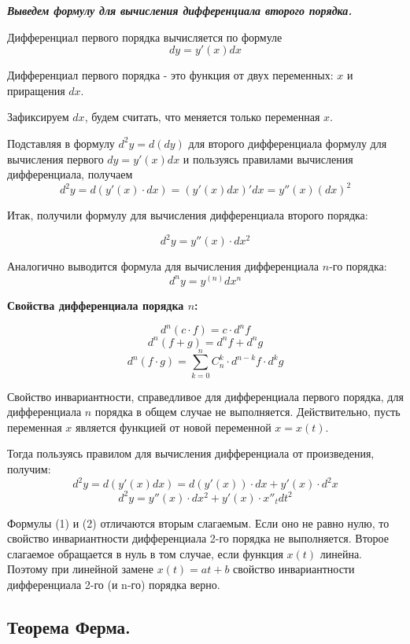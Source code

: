 \documentclass[a4paper,12pt]{article}
\theoremstyle{plain} %
\theoremstyle{definition} %
\theoremstyle{remark} %
\begin{document}
\textbf{\textit{Выведем формулу для вычисления дифференциала второго порядка.}}

Дифференциал первого порядка вычисляется по формуле
\[
	dy = y'(x) dx
\]

Дифференциал первого порядка - это функция от двух переменных: $x$ и приращения $dx$.

Зафиксируем $dx$, будем считать, что меняется только переменная $x$.

Подставляя в формулу $d^2y = d(dy)$ для второго дифференциала формулу для вычисления первого $dy = y'(x)dx$ и пользуясь правилами вычисления дифференциала, получаем
\[
	d^2y = d(y'(x) \cdot dx) = (y'(x)dx)'dx = y''(x)(dx)^2
\]

Итак, получили формулу для вычисления дифференциала второго порядка:

\[
	d^2y = y''(x) \cdot dx^2
\]

Аналогично выводится формула для вычисления дифференциала $n$-го порядка:
\[
	d^ny = y^{(n)}dx^n
\]

\textbf{Свойства дифференциала порядка $n$:}

\[
	d^n(c\cdot f) = c\cdot d^n f
\]
\[
	d^n(f + g) = d^nf + d^ng
\]
\[
	d^n(f\cdot g) = \sum_{k = 0}^n C_n^k \cdot d^{n-k}f \cdot d^k g
\]

Свойство инвариантности, справедливое для дифференциала первого порядка, для дифференциала $n$ порядка в общем случае не выполняется. Действительно, пусть переменная $x$ является функцией от новой переменной $x = x(t)$.

Тогда пользуясь правилом для вычисления дифференциала от произведения, получим:
\[
	d^2y = d(y'(x)dx) = d(y'(x)) \cdot dx + y'(x) \cdot d^2x
\]
\[
	d^2y = y''(x) \cdot dx^2 + y'(x) \cdot x''_t dt^2
\]

Формулы (1) и (2) отличаются вторым слагаемым. Если оно не равно нулю, то свойство инвариантности дифференциала 2-го порядка не выполняется. Второе слагаемое обращается в нуль в том случае, если функция $x(t)$ линейна. Поэтому при линейной замене $x(t) = at + b$ свойство инвариантности дифференциала 2-го (и n-го) порядка верно.




\newpage
\subsection*{Теорема Ферма.                                                                             }
\end{document}
